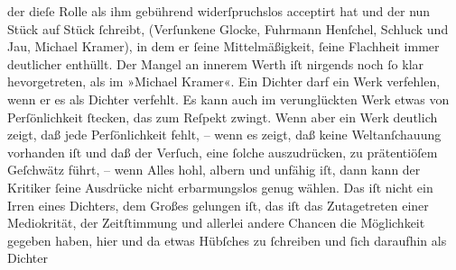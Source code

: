                der dieſe Rolle als ihm gebührend widerſpruchslos acceptirt hat und der nun Stück auf
               Stück{ }ſchreibt,  (Verſunkene Glocke, Fuhrmann
                  Henſchel, Schluck und Jau, Michael Kramer), in dem er{ }ſeine Mittelmäßigkeit,{ }ſeine Flachheit immer deutlicher enthüllt. Der Mangel an innerem Werth iſt nirgends
               noch{ }ſo klar hevorgetreten, als im »Michael
                  Kramer«. Ein Dichter darf ein Werk verfehlen, wenn er es als Dichter
               verfehlt. Es kann auch im verunglückten Werk  etwas
               von Perſönlichkeit{ }ſtecken, das zum Reſpekt zwingt. {\pb}Wenn aber ein Werk deutlich zeigt, daß jede Perſönlichkeit fehlt, – wenn es zeigt,
               daß keine Weltanſchauung vorhanden iſt und daß der Verſuch, eine{ }ſolche auszudrücken,
               zu  prätentiöſem Geſchwätz führt, – wenn Alles
               hohl, albern und unfähig iſt, dann kann der Kritiker{ }ſeine Ausdrücke nicht
               erbarmungslos genug  wählen. Das iſt nicht ein
               Irren eines Dichters, dem Großes gelungen iſt, das iſt das Zutagetreten einer
               Mediokrität, der Zeitſtimmung und allerlei andere Chancen die Möglichkeit gegeben
               haben, hier und da etwas Hübſches zu{ }ſchreiben und{ }ſich daraufhin als Dichter
